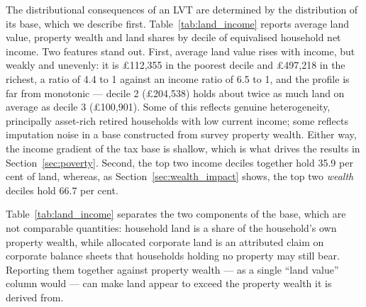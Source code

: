 The distributional consequences of an LVT are determined by the distribution of its base, which we describe first. Table~\ref{tab:land_income} reports average land value, property wealth and land shares by decile of equivalised household net income. Two features stand out. First, average land value rises with income, but weakly and unevenly: it is \pounds 112{,}355 in the poorest decile and \pounds 497{,}218 in the richest, a ratio of 4.4 to 1 against an income ratio of 6.5 to 1, and the profile is far from monotonic --- decile 2 (\pounds 204{,}538) holds about twice as much land on average as decile 3 (\pounds 100{,}901). Some of this reflects genuine heterogeneity, principally asset-rich retired households with low current income; some reflects imputation noise in a base constructed from survey property wealth. Either way, the income gradient of the tax base is shallow, which is what drives the results in Section~\ref{sec:poverty}. Second, the top two income deciles together hold 35.9 per cent of land, whereas, as Section~\ref{sec:wealth_impact} shows, the top two \emph{wealth} deciles hold 66.7 per cent.

Table~\ref{tab:land_income} separates the two components of the base, which are not comparable quantities: household land is a share of the household's own property wealth, while allocated corporate land is an attributed claim on corporate balance sheets that households holding no property may still bear. Reporting them together against property wealth --- as a single ``land value'' column would --- can make land appear to exceed the property wealth it is derived from.

